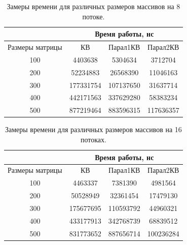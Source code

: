 \documentclass[12pt]{report}
\begin{document}
\begin{table}[h]
	\begin{center}
		\caption{\label{time4} Замеры времени для различных размеров массивов на 8 потоке.}
		\begin{tabular}{|c |c |c |c|} 
 			\hline
 			&\multicolumn{3}{|c|}{Время работы, нс}\\
 			\hline
			Размеры матрицы & КВ & Парал1КВ & Парал2КВ \\ [0.5ex] 
 			\hline\hline
 			100 & 4403638 & 5304634 & 3712704 \\
 			\hline
 			200 & 52234883 & 26568390 & 11046163 \\
 			\hline
			300 & 177331754 & 107137650 & 31637714 \\
			\hline
			400 & 442171563 & 337629280 & 58383234 \\
			\hline
			500 & 877219464 & 883596315 & 117636357 \\
			\hline
			\end{tabular}
	\end{center}
\end{table}

\begin{table}[h]
	\begin{center}
		\caption{\label{time5} Замеры времени для различных размеров массивов на 16 потоках.}
		\begin{tabular}{|c |c |c |c|} 
 			\hline
 			&\multicolumn{3}{|c|}{Время работы, нс}\\
 			\hline
			Размеры матрицы & КВ & Парал1КВ & Парал2КВ \\ [0.5ex] 
 			\hline\hline
 			100 & 4463337 & 7381390 & 4981564 \\
 			\hline
 			200 & 50528949 & 32361454 &  17479130 \\
 			\hline
			300 & 175677695 & 110593792 & 44960321 \\
			\hline
			400 & 433177913 & 342768739 & 68839512 \\
			\hline
			500 & 831773652 & 887656714 & 100236284 \\
			\hline
			\end{tabular}
	\end{center}
\end{table}
\newpage
\end{document}
